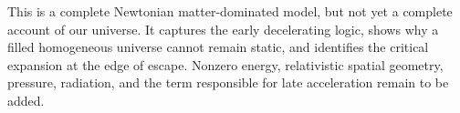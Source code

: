 This is a complete Newtonian matter-dominated model, but not yet a complete account of our universe. It captures the early decelerating logic, shows why a filled homogeneous universe cannot remain static, and identifies the critical expansion at the edge of escape. Nonzero energy, relativistic spatial geometry, pressure, radiation, and the term responsible for late acceleration remain to be added.
